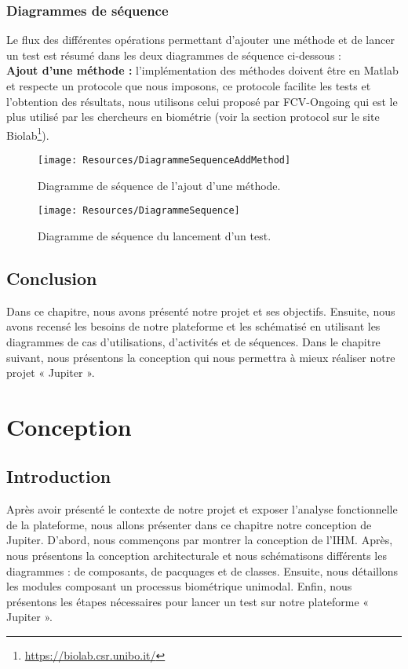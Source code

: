 \subsection{Diagrammes de séquence } 
Le flux des différentes opérations permettant d'ajouter une méthode et de lancer un test est résumé dans les deux diagrammes de séquence ci-dessous :
\\\textbf{ Ajout d'une méthode : } l'implémentation des méthodes doivent être en Matlab et respecte un protocole que nous imposons, ce protocole facilite les tests et l'obtention des résultats, nous utilisons celui proposé par FCV-Ongoing qui est le plus utilisé par les chercheurs en biométrie (voir la section protocol sur le site Biolab\footnote{\href{https://biolab.csr.unibo.it/FVCOnGoing/UI/Form/BenchmarkAreas/BenchmarkAreaFV.aspx}{https://biolab.csr.unibo.it/} }).

\begin{figure}[H]
	\centering
	\texttt{[image: Resources/DiagrammeSequenceAddMethod]}
	
	\caption{Diagramme de séquence de l'ajout d'une méthode.}
	\label{activitysueq2}
\end{figure}
\begin{figure}[H]
	\centering
	\texttt{[image: Resources/DiagrammeSequence]}
	
	\caption{Diagramme de séquence du lancement d'un test.}
	\label{activitysueq}
\end{figure}
\clearpage
\section{Conclusion}
Dans ce chapitre, nous avons présenté notre projet et ses objectifs. Ensuite, nous avons recensé les besoins de notre plateforme et les schématisé en utilisant les diagrammes de cas d'utilisations, d'activités et de séquences. Dans le chapitre suivant, nous présentons la conception qui nous permettra à mieux réaliser notre projet « Jupiter ».

\chapter{Conception}
\section{Introduction}
Après avoir présenté le contexte de notre projet et exposer l'analyse fonctionnelle de la plateforme, nous allons présenter dans ce chapitre notre conception de Jupiter. D’abord, nous commençons par montrer la conception de l'IHM. Après, nous présentons la conception architecturale et nous schématisons différents les diagrammes : de composants, de pacquages et de classes. Ensuite, nous détaillons les modules composant un processus biométrique unimodal. Enfin, nous présentons les étapes nécessaires pour lancer un test sur notre plateforme « Jupiter ».
